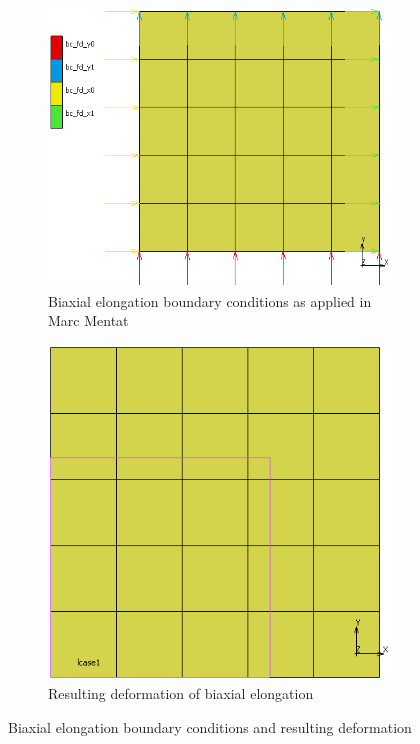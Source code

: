 \begin{figure}[H]
	\centering
	\begin{subfigure}[b]{0.4\textwidth}
		\centering
		\includegraphics[width=\textwidth]{C1BC.png}
		\caption{Biaxial elongation boundary conditions as applied in Marc Mentat}
		\label{fig:c2bc}
	\end{subfigure}
	\hfill
	\begin{subfigure}[b]{0.45\textwidth}
		\centering
		\includegraphics[width=\textwidth]{C2Def.png}
		\caption{Resulting deformation of biaxial elongation}
		\label{fig:c2def}
	\end{subfigure}
	\caption[Biaxial elongation boundary conditions and deformation]{Biaxial elongation boundary conditions and resulting deformation}
	\label{fig:c2}
\end{figure}

